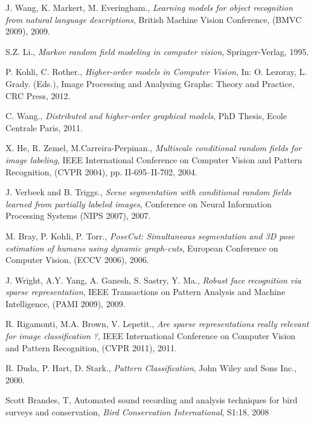 \documentclass{article}
\begin{document}
\begin{thebibliography}{100}
J. Wang, K. Markert, M. Everingham., \emph{Learning models for object recognition from natural language descriptions}, British Machine Vision Conference, (BMVC 2009), 2009. 

S.Z. Li., \emph{Markov random field modeling in computer vision}, Springer-Verlag, 1995. 

P. Kohli, C. Rother., \emph{Higher-order models in Computer Vision}, In: O. Lezoray, L. Grady. (Eds.), Image Processing and Analysing Graphs: Theory and Practice, CRC Press, 2012. 

C. Wang., \emph{Distributed and higher-order graphical models}, PhD Thesis, Ecole Centrale Paris, 2011.

X. He, R. Zemel, M.Carreira-Perpinan., \emph{Multiscale conditional random fields for image labeling}, IEEE International Conference on Computer Vision and Pattern Recognition, (CVPR 2004), pp. II-695--II-702, 2004. 

J. Verbeek and B. Triggs., \emph{Scene segmentation with conditional random fields learned from partially labeled images}, Conference on Neural Information Processing Systems (NIPS 2007), 2007. 

M. Bray, P. Kohli, P. Torr., \emph{PoseCut: Simultaneous segmentation and 3D pose estimation of humans using dynamic graph-cuts}, European Conference on Computer Vision, (ECCV 2006), 2006. 

J. Wright, A.Y. Yang, A. Ganesh, S. Sastry, Y. Ma., \emph{Robust face recognition via sparse representation}, IEEE Transactions on Pattern Analysis and Machine Intelligence, (PAMI 2009), 2009. 

R. Rigamonti, M.A. Brown, V. Lepetit., \emph{Are sparse representations really relevant for image classification ?}, IEEE International Conference on Computer Vision and Pattern Recognition, (CVPR 2011), 2011. 

R. Duda, P. Hart, D. Stark., \emph{Pattern Classification}, John Wiley and Sons Inc., 2000. 











Scott Brandes, T, Automated sound recording and analysis techniques for
bird surveys and conservation, \emph{Bird Conservation International}, S1:18, 2008


\end{thebibliography}
\end{document}
